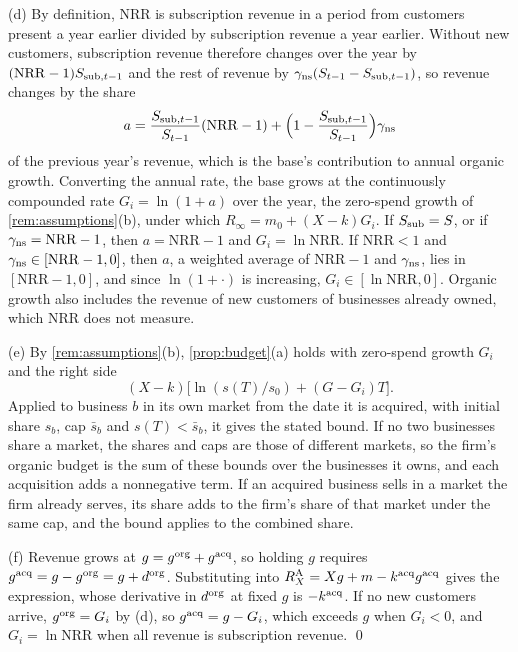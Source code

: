 (d) By definition, NRR is subscription revenue in a period from customers present a year earlier divided by subscription revenue a year earlier. Without new customers, subscription revenue therefore changes over the year by $(\mathrm{NRR}-1)S_{{\rm sub},t-1}$ and the rest of revenue by $\gamma_{\rm ns}(S_{t-1}-S_{{\rm sub},t-1})$, so revenue changes by the share
\[
a=\frac{S_{{\rm sub},t-1}}{S_{t-1}}(\mathrm{NRR}-1)+\Bigl(1-\frac{S_{{\rm sub},t-1}}{S_{t-1}}\Bigr)\gamma_{\rm ns}
\]
of the previous year's revenue, which is the base's contribution to annual organic growth. Converting the annual rate, the base grows at the continuously compounded rate $G_i=\ln(1+a)$ over the year, the zero-spend growth of \autoref{rem:assumptions}(b), under which $R_\infty=m_0+(X-k)G_i$. If $S_{\rm sub}=S$, or if $\gamma_{\rm ns}=\mathrm{NRR}-1$, then $a=\mathrm{NRR}-1$ and $G_i=\ln\mathrm{NRR}$. If $\mathrm{NRR}<1$ and $\gamma_{\rm ns}\in[\mathrm{NRR}-1,0]$, then $a$, a weighted average of $\mathrm{NRR}-1$ and $\gamma_{\rm ns}$, lies in $[\mathrm{NRR}-1,0]$, and since $\ln(1+\cdot)$ is increasing, $G_i\in[\ln\mathrm{NRR},0]$. Organic growth also includes the revenue of new customers of businesses already owned, which NRR does not measure.

(e) By \autoref{rem:assumptions}(b), \autoref{prop:budget}(a) holds with zero-spend growth $G_i$ and the right side
\[
(X-k)\bigl[\ln(s(T)/s_0)+(G-G_i)T\bigr].
\]
Applied to business $b$ in its own market from the date it is acquired, with initial share $s_b$, cap $\bar s_b$ and $s(T)<\bar s_b$, it gives the stated bound. If no two businesses share a market, the shares and caps are those of different markets, so the firm's organic budget is the sum of these bounds over the businesses it owns, and each acquisition adds a nonnegative term. If an acquired business sells in a market the firm already serves, its share adds to the firm's share of that market under the same cap, and the bound applies to the combined share.

(f) Revenue grows at $g=g^{\rm org}+g^{\rm acq}$, so holding $g$ requires $g^{\rm acq}=g-g^{\rm org}=g+d^{\rm org}$. Substituting into $R^{\rm A}_X=Xg+m-k^{\rm acq}g^{\rm acq}$ gives the expression, whose derivative in $d^{\rm org}$ at fixed $g$ is $-k^{\rm acq}$. If no new customers arrive, $g^{\rm org}=G_i$ by (d), so $g^{\rm acq}=g-G_i$, which exceeds $g$ when $G_i<0$, and $G_i=\ln\mathrm{NRR}$ when all revenue is subscription revenue. \qed

